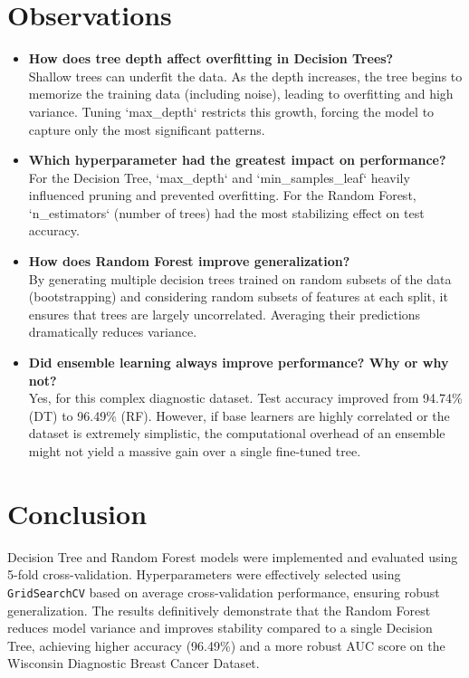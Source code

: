 \documentclass[11pt]{article}
\begin{document}
\section*{Observations}
\begin{itemize}
    \item \textbf{How does tree depth affect overfitting in Decision Trees?} \\
    Shallow trees can underfit the data. As the depth increases, the tree begins to memorize the training data (including noise), leading to overfitting and high variance. Tuning `max\_depth` restricts this growth, forcing the model to capture only the most significant patterns.
    
    \item \textbf{Which hyperparameter had the greatest impact on performance?} \\
    For the Decision Tree, `max\_depth` and `min\_samples\_leaf` heavily influenced pruning and prevented overfitting. For the Random Forest, `n\_estimators` (number of trees) had the most stabilizing effect on test accuracy.
    
    \item \textbf{How does Random Forest improve generalization?} \\
    By generating multiple decision trees trained on random subsets of the data (bootstrapping) and considering random subsets of features at each split, it ensures that trees are largely uncorrelated. Averaging their predictions dramatically reduces variance.
    
    \item \textbf{Did ensemble learning always improve performance? Why or why not?} \\
    Yes, for this complex diagnostic dataset. Test accuracy improved from 94.74\% (DT) to 96.49\% (RF). However, if base learners are highly correlated or the dataset is extremely simplistic, the computational overhead of an ensemble might not yield a massive gain over a single fine-tuned tree.
\end{itemize}


\section*{Conclusion}
Decision Tree and Random Forest models were implemented and evaluated using 5-fold cross-validation. Hyperparameters were effectively selected using \texttt{GridSearchCV} based on average cross-validation performance, ensuring robust generalization. The results definitively demonstrate that the Random Forest reduces model variance and improves stability compared to a single Decision Tree, achieving higher accuracy (96.49\%) and a more robust AUC score on the Wisconsin Diagnostic Breast Cancer Dataset.
\end{document}
